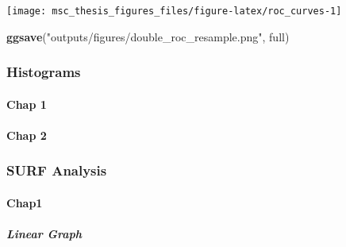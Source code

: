 \documentclass[
]{article}
\newenvironment{Shaded}{\begin{snugshade}}{\end{snugshade}}
\newcommand{\KeywordTok}[1]{\textcolor[rgb]{0.13,0.29,0.53}{\textbf{#1}}}
\newcommand{\NormalTok}[1]{#1}
\newcommand{\StringTok}[1]{\textcolor[rgb]{0.31,0.60,0.02}{#1}}
\begin{document}
\texttt{[image: msc\_thesis\_figures\_files/figure-latex/roc\_curves-1]}

\begin{Shaded}
\begin{Highlighting}[]
\KeywordTok{ggsave}\NormalTok{(}\StringTok{"outputs/figures/double_roc_resample.png"}\NormalTok{, full)}
\end{Highlighting}
\end{Shaded}

\hypertarget{histograms}{%
\subsubsection{Histograms}\label{histograms}}

\hypertarget{chap-1-1}{%
\paragraph{Chap 1}\label{chap-1-1}}

\hypertarget{chap-2-2}{%
\paragraph{Chap 2}\label{chap-2-2}}

\hypertarget{surf-analysis}{%
\subsubsection{SURF Analysis}\label{surf-analysis}}

\hypertarget{chap1}{%
\paragraph{Chap1}\label{chap1}}

\hypertarget{linear-graph}{%
\subparagraph{Linear Graph}\label{linear-graph}}
\end{document}
